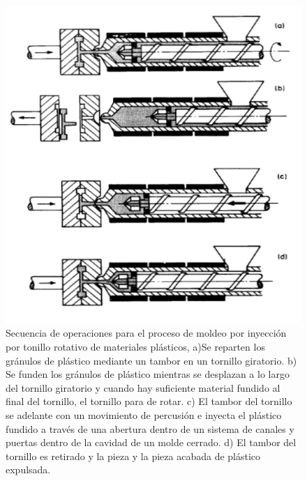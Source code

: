 \documentclass[a4paper, 11pt]{article}
\begin{document}
\begin{figure}[h!] 
\centering
\captionsetup{justification=centerlast}
    \includegraphics[scale=0.5]{proceso_inyeccion.png} 
     \caption{Secuencia de operaciones para el proceso de moldeo por inyección por tonillo rotativo de materiales plásticos, a)Se reparten los gránulos de plástico mediante un tambor en un tornillo giratorio. b) Se funden los gránulos de plástico mientras se desplazan a lo largo del tornillo giratorio y cuando hay suficiente material fundido al final del tornillo, el tornillo para de rotar. c) El tambor del tornillo se adelante con un movimiento de percusión e inyecta el plástico fundido a través de una abertura dentro de un sistema de canales y puertas dentro de la cavidad de un molde cerrado. d) El tambor del tornillo es retirado y la pieza y la pieza acabada de plástico expulsada.}
    \label{proceso_inyeccion}
\end{figure}
\end{document}
